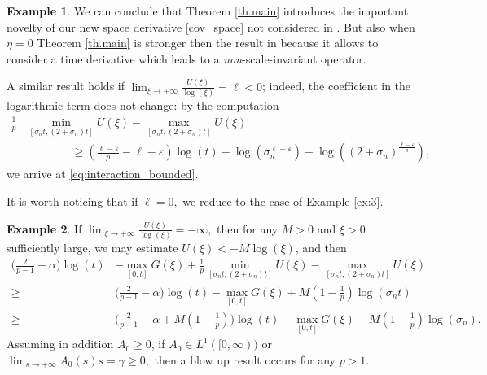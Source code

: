 \documentclass[11pt,reqno]{amsart}
\theoremstyle{definition}
\newtheorem{example}{Example}
\numberwithin{equation}{section}
\newcommand{\eps}{\varepsilon}
\begin{document}
\begin{example}
We can conclude that Theorem \ref{th.main} introduces the important novelty of our new space derivative \eqref{cov_space} not considered in \cite{CGL2021}. But also when $\eta=0$ Theorem \ref{th.main} is stronger then the result in \cite{CGL2021} because it allows to consider a time derivative which leads to a \textit{non}-scale-invariant operator.  



A similar result holds if $\displaystyle{\lim_{\xi\to +\infty}\frac{U(\xi)}{\log(\xi)}}=\ell<0$; indeed, the coefficient in the logarithmic term does not change: by the computation
%
\begin{align*}
\frac{1}{p} &\min_{[\sigma_n t,(2+\sigma_n)t]} U(\xi) -\max_{[\sigma_n t,(2+\sigma_n)t]} U(\xi) \\
&\hspace{4em} \geq  \left(\frac{\ell-\eps}{p}-\ell-\eps\right)\log(t)- \log\left(\sigma_n^{\ell+\varepsilon}\right)+\log\left((2+\sigma_n)^\frac{\ell-\varepsilon}{p}\right),
    \end{align*}
%
we arrive at \eqref{eq:interaction_bounded}.

It is worth noticing that if $\ell=0,$ we reduce to the case of Example \ref{ex:3}.

\end{example}
\begin{example} \label{ex:5}
    If $\displaystyle{\lim_{\xi \to+\infty}}\frac{U(\xi)}{\log(\xi)}= -\infty,$ then for any $M>0$ and $\xi>0$ sufficiently large, we may estimate $U(\xi)<-M \log(\xi)$, and then
%
\begin{align*}
\Big(\frac{2}{p-1}-\alpha\Big)\log(t)&-\max_{[0,t]}G(\xi)
    +\frac{1}{p} \min_{[\sigma_n t,(2+\sigma_n)t]} U(\xi) -\max_{[\sigma_n t,(2+\sigma_n)t]} U(\xi) \\
 \geq&
 \Big(\frac{2}{p-1}-\alpha\Big)\log(t)-\max_{[0,t]}G(\xi)+M\left(1-\frac{1}{p}\right) \log(\sigma_n t)\\
 \geq &\Big(\frac{2}{p-1}-\alpha+M\left(1-\frac{1}{p}\right)\Big)\log(t)-\max_{[0,t]}G(\xi)+M\left(1-\frac{1}{p}\right) \log(\sigma_n).
\end{align*}
Assuming in addition $A_0\geq 0$, if $A_0\in L^1([0,\infty))$ or $\displaystyle{\lim_{s\to +\infty}}A_0(s)s=\gamma\geq 0,$ then a blow up result occurs for any $p>1$. 
\end{example}
\end{document}

